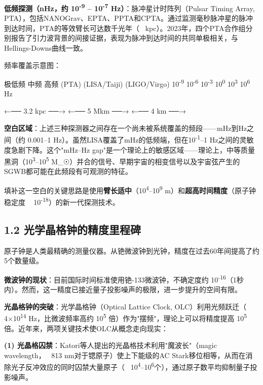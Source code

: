 \documentclass[12pt,a4paper]{article}
\begin{document}
\textbf{低频探测（nHz，约 10\textsuperscript{-9} – 10\textsuperscript{-7} Hz）}：脉冲星计时阵列（Pulsar Timing Array, PTA），包括NANOGrav、EPTA、PPTA和CPTA。通过监测毫秒脉冲星的脉冲到达时间，PTA的等效臂长可达数千光年（~ kpc）。2023年，四个PTA合作组分别报告了引力波背景的间接证据，表现为脉冲到达时间的共同单极相关，与Hellings-Downs曲线一致\cite{ref4}。

频率覆盖示意图：

极低频          中频             高频
(PTA)         (LISA/Taiji)     (LIGO/Virgo)
10\textsuperscript{-9}    10\textsuperscript{-6}    10\textsuperscript{-3}     10\textsuperscript{0}     10\textsuperscript{3}    10\textsuperscript{6} Hz

←── 3.2 kpc ──→  ←── 5 Mkm ──→  ←── 4 km ──→

\textbf{空白区域}：上述三种探测器之间存在一个尚未被系统覆盖的频段——mHz到Hz之间（约 0.001–1 Hz）。虽然LISA覆盖了mHz的低频端，但在10\textsuperscript{-1}–1 Hz之间的灵敏度急剧下降。这个"mHz–Hz gap"是一个理论上的敏感区域——理论上，中等质量黑洞（10\textsuperscript{3}–10\textsuperscript{5} M_☉）并合的信号、早期宇宙的相变信号以及宇宙弦产生的SGWB都可能在此频段有可观测的特征。

填补这一空白的关键思路是使用\textbf{臂长适中}（10\textsuperscript{4}–10\textsuperscript{9} m）和\textbf{超高时间精度}（原子钟稳定度 ~ 10\textsuperscript{-18}）的新一代探测技术。

\subsection{1.2 光学晶格钟的精度里程碑}


原子钟是人类最精确的测量仪器。从铯微波钟到光钟，精度在过去60年间提高了约5个数量级。

\textbf{微波钟的现状}：目前国际时间标准使用铯-133微波钟，不确定度约 10\textsuperscript{-16}（1秒内）。然而，这一精度已接近量子投影噪声的极限，进一步提升的空间有限。

\textbf{光晶格钟的突破}：光学晶格钟（Optical Lattice Clock, OLC）利用光频跃迁（~ 4×10\textsuperscript{14} Hz，比微波频率高约 10\textsuperscript{5} 倍）作为"摆频"，理论上可以将精度提高 10\textsuperscript{5} 倍。近年来，两项关键技术使OLC从概念走向现实：

\textbf{(1) 光晶格囚禁}：Katori等人提出的光晶格技术利用"魔波长"（magic wavelength，~ 813 nm对于锶原子）使上下能级的AC Stark移位相等，从而在消除光子反冲效应的同时囚禁大量原子（~ 10\textsuperscript{4}–10\textsuperscript{6}个），通过原子数平均抑制量子投影噪声\cite{ref5}。
\end{document}
